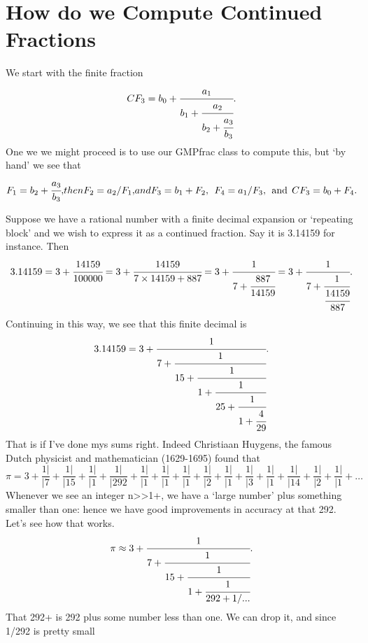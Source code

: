 \documentclass[16pt]{article}
\numberwithin{equation}{section}
\numberwithin{figure}{section}
\numberwithin{figure}{section}
\numberwithin{equation}{section}
\begin{document}
\section{How do we Compute Continued Fractions}


We start with the finite fraction
\begin{equation}
CF_{3}=b_0 +\cfrac{a_1}{b_1+\cfrac{a_2}{b_2+\cfrac{a_3}{b_3}}}.
\end{equation}
One we we might proceed is to use our GMPfrac class to compute this, but `by hand' we see that
\begin{equation}
F_1=b_2+\cfrac{a_3}{b_3},
$$ then  $$
F_2 = a_2/F_1,
$$  and $$
F_3=b_1+F_2, \> \> F_4=a_1/F_3, \> \> {\rm and} \> \> CF_3=b_0+F_4.
\end{equation}

Suppose we have a rational number with a finite decimal expansion or `repeating block'
and we wish to express it as a continued fraction. Say it is 3.14159 for instance.
Then
\begin{equation}
3.14159=3+\cfrac{14159}{100000}=3+\cfrac{14159}{7\times 14159+887}
=3+\cfrac{1}{7+\cfrac{887}{14159}}=3+\cfrac{1}{ 7+\cfrac{1}{\cfrac{14159}{887}}}.
\end{equation}
Continuing in this way, we see that this finite decimal is
\begin{equation}
3.14159
=3+\cfrac{1}{ 7+ \cfrac{1}{  15+\cfrac{1}{1+\cfrac{1}{25+\cfrac{1}{1+\cfrac{4}{29} }}}}}.          
\end{equation}
That is if I've done mys sums right.
Indeed Christiaan Huygens, the famous Dutch physicist and mathematician (1629-1695) found that
\begin{equation}
\pi=3 +\frac{1\vert}{\vert 7}+\frac{1 \vert}{\vert 15}+\frac{1 \vert}{\vert 1}
+\frac{1 \vert}{\vert 292}+\frac{1 \vert}{\vert 1}+\frac{1 \vert}{\vert 1}+\frac{1 \vert}{\vert 1}
+\frac{1 \vert}{\vert 2}+\frac{1 \vert}{\vert 1}+\frac{1 \vert}{\vert 3}+\frac{1 \vert}{\vert 1}
+\frac{1 \vert}{\vert 14}+\frac{1 \vert}{\vert 2}+\frac{1 \vert}{\vert 1}+\ldots
\end{equation}
Whenever we see an integer n>>1+, we have a `large number' plus something smaller than one: hence
we have good improvements in accuracy at that 292. Let's see how that works.
\begin{equation}
\pi \approx
3+\cfrac{1}{ 7+ \cfrac{1}{  15+\cfrac{1}{1+\cfrac{1}{292+1/...} }}}.          
\end{equation}
That 292+ is 292 plus some number less than one. We can drop it, and since 1/292 is pretty small
\end{document}
